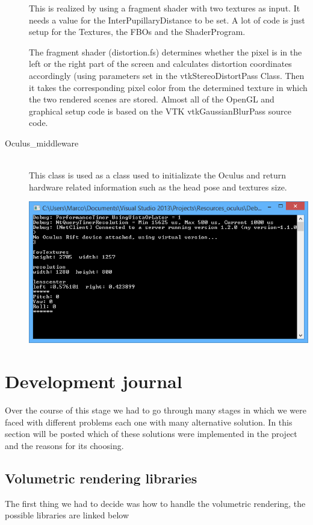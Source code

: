 \documentclass[11pt]{article} %
\begin{document}
\begin{description}
This is realized by using a fragment shader with two textures as input. It needs a value for the InterPupillaryDistance to be set. A lot of code is just setup for the Textures, the FBOs and the ShaderProgram.


The fragment shader (distortion.fs) determines whether the pixel is in the left or the right part of the screen and calculates distortion coordinates accordingly (using parameters set in the vtkStereoDistortPass Class. Then it takes the corresponding pixel color from the determined texture in which the two rendered scenes are stored.
Almost all of the OpenGL and graphical setup code is based on the VTK vtkGaussianBlurPass source code.
\item[Oculus\_middleware] \hfill \\
This class is used as a class used to initializate the Oculus and return hardware related information such as the head pose and textures size.

\includegraphics[width=1.0\linewidth]{img/rift_middleware.PNG}

\end{description}



\newpage

\section{Development journal}
Over the course of this stage we had to go through many stages in which we were faced with different problems each one with many alternative solution. In this section will be posted which of these solutions were implemented in the project and the reasons for its choosing. 

\subsection{Volumetric rendering libraries}
The first thing we had to decide was how to handle the volumetric rendering, the possible libraries are linked below
\end{document}
